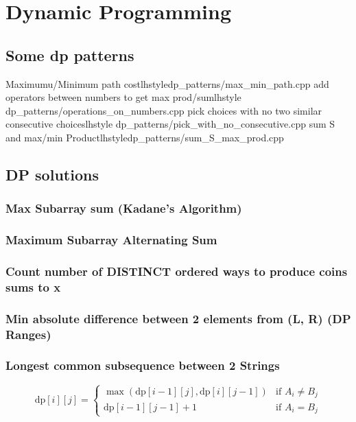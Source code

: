 \section{Dynamic Programming}
  \subsection{Some dp patterns}
        {Maximumu/Minimum path cost}{lhstyle}{dp_patterns/max_min_path.cpp}
        {add operators between numbers to get max prod/sum}{lhstyle} {dp_patterns/operations_on_numbers.cpp}
        {pick choices with no two similar consecutive choices}{lhstyle} {dp_patterns/pick_with_no_consecutive.cpp}
        {sum S and max/min Product}{lhstyle}{dp_patterns/sum_S_max_prod.cpp}

   \subsection{DP solutions}
       \subsubsection{Max Subarray sum (Kadane’s Algorithm)}

       \subsubsection{Maximum Subarray Alternating Sum}


     \subsubsection{Count number of DISTINCT ordered ways to produce coins sums to x}

     \subsubsection{Min absolute difference between 2 elements from (L, R) (DP Ranges)}

     \subsubsection{Longest common subsequence between 2 Strings}
            \[
            \text{dp}[i][j] =
            \begin{cases}
                \max(\text{dp}[i-1][j], \text{dp}[i][j-1]) & \text{if } A_i \neq B_j \\
                \text{dp}[i-1][j-1] + 1 & \text{if } A_i = B_j
            \end{cases}
            \]

